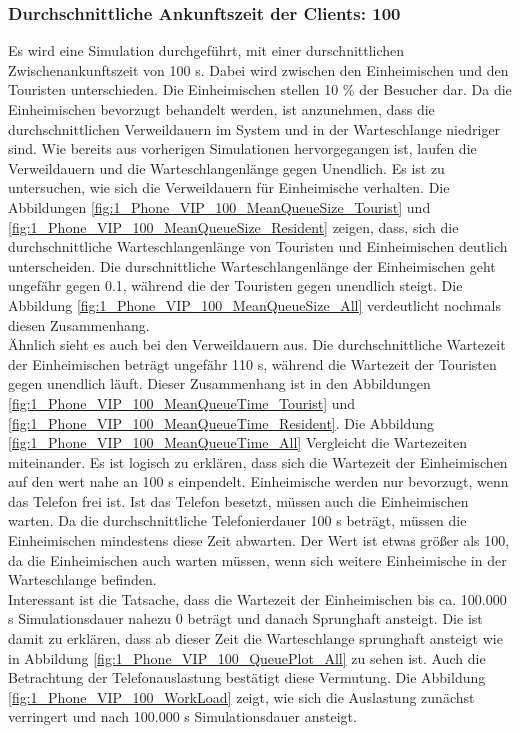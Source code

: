 \subsubsection{Durchschnittliche Ankunftszeit der Clients: 100}
Es wird eine Simulation durchgeführt, mit einer durschnittlichen Zwischenankunftszeit von 100 s. Dabei wird zwischen den Einheimischen und den Touristen unterschieden. Die Einheimischen stellen 10 \% der Besucher dar. Da die Einheimischen bevorzugt behandelt werden, ist anzunehmen, dass die durchschnittlichen Verweildauern im System und in der Warteschlange niedriger sind. Wie bereits aus vorherigen Simulationen hervorgegangen ist, laufen die Verweildauern und die Warteschlangenlänge gegen Unendlich. Es ist zu untersuchen, wie sich die Verweildauern für Einheimische verhalten. Die Abbildungen \ref{fig:1_Phone_VIP_100_MeanQueueSize_Tourist} und \ref{fig:1_Phone_VIP_100_MeanQueueSize_Resident} zeigen, dass, sich die durchschnittliche Warteschlangenlänge von Touristen und Einheimischen deutlich unterscheiden. Die durschnittliche Warteschlangenlänge der Einheimischen geht ungefähr gegen 0.1, während die der Touristen gegen unendlich steigt. Die Abbildung \ref{fig:1_Phone_VIP_100_MeanQueueSize_All} verdeutlicht nochmals diesen Zusammenhang. \\
Ähnlich sieht es auch bei den Verweildauern aus. Die durchschnittliche Wartezeit der Einheimischen beträgt ungefähr 110 s, während die Wartezeit der Touristen gegen unendlich läuft. Dieser Zusammenhang ist in den Abbildungen \ref{fig:1_Phone_VIP_100_MeanQueueTime_Tourist} und \ref{fig:1_Phone_VIP_100_MeanQueueTime_Resident}. Die Abbildung \ref{fig:1_Phone_VIP_100_MeanQueueTime_All} Vergleicht die Wartezeiten miteinander. Es ist logisch zu erklären, dass sich die Wartezeit der Einheimischen auf den wert nahe an 100 s einpendelt. Einheimische werden nur bevorzugt, wenn das Telefon frei ist. Ist das Telefon besetzt, müssen auch die Einheimischen warten. Da die durchschnittliche Telefonierdauer 100 s beträgt, müssen die Einheimischen mindestens diese Zeit abwarten. Der Wert ist etwas größer als 100, da die Einheimischen auch warten müssen, wenn sich weitere Einheimische in der Warteschlange befinden.\\
Interessant ist die Tatsache, dass die Wartezeit der Einheimischen bis ca. 100.000 s Simulationsdauer nahezu 0 beträgt und danach Sprunghaft ansteigt. Die ist damit zu erklären, dass ab dieser Zeit die Warteschlange sprunghaft ansteigt wie in Abbildung \ref{fig:1_Phone_VIP_100_QueuePlot_All} zu sehen ist. Auch die Betrachtung der Telefonauslastung bestätigt diese Vermutung. Die Abbildung \ref{fig:1_Phone_VIP_100_WorkLoad} zeigt, wie sich die Auslastung zunächst verringert und nach 100.000 s Simulationsdauer ansteigt. \\
